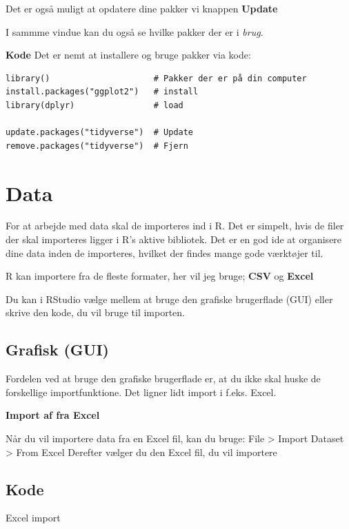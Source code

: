 \documentclass[
]{book}
\begin{document}
Det er også muligt at opdatere dine pakker vi knappen \textbf{Update}

I sammme vindue kan du også se hvilke pakker der er i \emph{brug}.

\textbf{Kode}
Det er nemt at installere og bruge pakker via kode:

\begin{verbatim}
library()                     # Pakker der er på din computer
install.packages("ggplot2")   # install
library(dplyr)                # load

update.packages("tidyverse")  # Update
remove.packages("tidyverse")  # Fjern
\end{verbatim}

\hypertarget{data}{%
\chapter{Data}\label{data}}

For at arbejde med data skal de importeres ind i R. Det er simpelt, hvis de filer der skal importeres ligger i R's aktive bibliotek. Det er en god ide at organisere dine data inden de importeres, hvilket der findes mange gode værktøjer til.

R kan importere fra de fleste formater, her vil jeg bruge; \textbf{CSV} og \textbf{Excel}

Du kan i RStudio vælge mellem at bruge den grafiske brugerflade (GUI) eller skrive den kode, du vil bruge til importen.

\hypertarget{grafisk-gui}{%
\section{Grafisk (GUI)}\label{grafisk-gui}}

Fordelen ved at bruge den grafiske brugerflade er, at du ikke skal huske de forskellige importfunktione. Det ligner lidt import i f.eks. Excel.

\textbf{Import af fra Excel}

Når du vil importere data fra en Excel fil, kan du bruge: File \textgreater{} Import Dataset \textgreater{} From Excel
Derefter vælger du den Excel fil, du vil importere

\hypertarget{kode}{%
\section{Kode}\label{kode}}

Excel import
\end{document}
